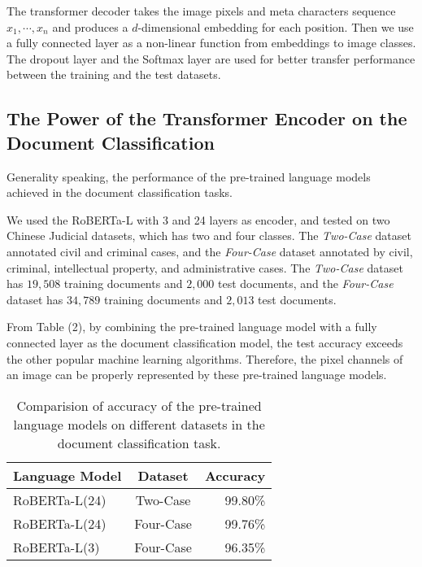 \documentclass[runningheads]{llncs}
\begin{document}
\par The transformer decoder takes the image pixels and meta characters sequence $x_1,\cdots,x_n$ and produces a $d$-dimensional
embedding for each position.
Then we use a fully connected layer as a non-linear function from embeddings to image classes.
The dropout layer and the Softmax layer are used for better transfer performance between the training and the test datasets.

\subsection{The Power of the Transformer Encoder on the Document Classification}

Generality speaking, the performance of the pre-trained language models achieved in the document classification tasks.

We used the RoBERTa-L with 3 and 24 layers as encoder, and tested on two Chinese Judicial datasets, which has two and four classes.
The \textit{Two-Case} dataset annotated civil and criminal cases, and the \textit{Four-Case} dataset annotated by civil, criminal, intellectual property, and administrative cases.
The \textit{Two-Case} dataset has $19,508$ training documents and $2,000$ test documents, and the \textit{Four-Case} dataset has $34,789$ training documents and $2,013$ test documents.

From Table (2), by combining the pre-trained language model with a fully connected layer as the document classification model,
the test accuracy exceeds the other popular machine learning algorithms.
Therefore, the pixel channels of an image can be properly represented by these pre-trained language models.

\begin{table}
\begin{center}
\begin{tabular}{|l|c|r|}
\hline
Language Model 	& Dataset & Accuracy \\
\hline\hline
RoBERTa-L(24) & Two-Case	&	99.80\% \\
RoBERTa-L(24) & Four-Case	&	99.76\% \\
RoBERTa-L(3)  & Four-Case	&	96.35\% \\
\hline
\end{tabular}
\end{center}
\caption{Comparision of accuracy of the pre-trained language models on different datasets in the document classification task.}
\end{table}
\end{document}
